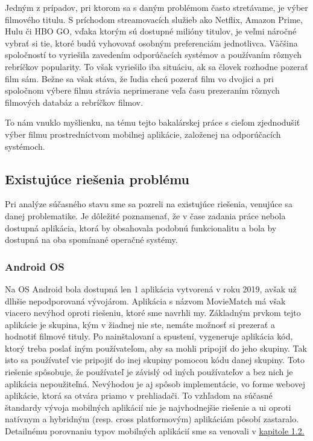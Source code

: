 Jedným z prípadov, pri ktorom sa s daným problémom často stretávame, je výber filmového titulu. S príchodom streamovacích služieb ako Netflix, Amazon Prime, Hulu či HBO GO, vďaka ktorým sú dostupné milióny titulov, je veľmi náročné vybrať si tie, ktoré budú vyhovovať osobným preferenciám jednotlivca. Väčšina spoločností to vyriešila zavedením odporúčacích systémov a používaním rôznych rebríčkov popularity. To však vyriešilo iba situáciu, ak sa človek rozhodne pozerať film sám. Bežne sa však stáva, že ľudia chcú pozerať film vo dvojici a pri spoločnom výbere filmu strávia neprimerane veľa času prezeraním rôznych filmových databáz a rebríčkov filmov. 

To nám vnuklo myšlienku, na tému tejto bakalárskej práce s cieľom zjednodušiť výber filmu  prostredníctvom mobilnej aplikácie, založenej na odporúčacích systémoch.

\subsection{Existujúce riešenia problému}
Pri analýze súčasného stavu sme sa pozreli na existujúce riešenia, venujúce sa danej problematike. Je dôležité poznamenať, že v čase zadania práce nebola dostupná aplikácia, ktorá by obsahovala podobnú funkcionalitu a bola by dostupná na oba spomínané operačné systémy. 
\subsubsection{Android OS}
Na OS Android bola dostupná len 1 aplikácia vytvorená v roku 2019, avšak už dlhšie nepodporovaná vývojárom. Aplikácia s názvom MovieMatch má však viacero nevýhod oproti riešeniu, ktoré sme navrhli my. Základným prvkom tejto aplikácie je skupina, kým v žiadnej nie ste, nemáte možnosť si prezerať a hodnotiť filmové tituly. Po nainštalovaní a spustení, vygeneruje aplikácia kód, ktorý treba poslať iným používateľom, aby sa mohli pripojiť do jeho skupiny. Tak isto sa používateľ vie pripojiť do inej skupiny pomocou kódu danej skupiny. Toto riešenie spôsobuje, že používateľ je závislý od iných používateľov a bez nich je aplikácia nepoužiteľná. Nevýhodou je aj spôsob implementácie, vo forme webovej aplikácie, ktorá sa otvára priamo v prehliadači. To vzhľadom na súčasné štandardy vývoja mobilných aplikácií nie je najvhodnejšie riešenie a \acrshort{ui} oproti natívnym a hybridným (resp. cross platformovým) aplikáciám pôsobí zastaralo. Detailnému porovnaniu typov mobilných aplikácií sme sa venovali v \hyperref[sec:typy aplikacii]{kapitole 1.2.}
